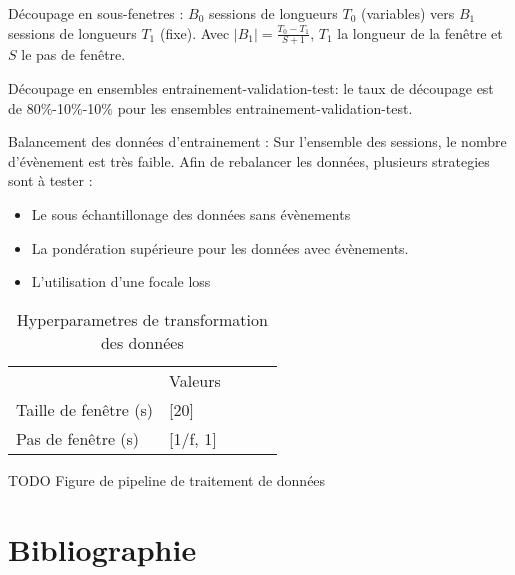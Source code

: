 \documentclass{article}
\begin{document}
    Découpage en sous-fenetres : $B_0$ sessions de longueurs $T_0$ (variables) vers $B_1$ sessions de longueurs $T_1$ (fixe). Avec $|B_1| = \frac{T_0-T_1}{S+1}$, $T_1$ la longueur de la fenêtre et $S$ le pas de fenêtre.

    Découpage en ensembles entrainement-validation-test: le taux de découpage est de 80\%-10\%-10\% pour les ensembles entrainement-validation-test.

    Balancement des données d'entrainement : Sur l'ensemble des sessions, le nombre d'évènement est très faible. Afin de rebalancer les données, plusieurs strategies sont à tester :
    \begin{itemize}
        \item Le sous échantillonage des données sans évènements
        \item La pondération supérieure pour les données avec évènements.
        \item L'utilisation d'une focale loss
    \end{itemize}

    \begin{table}[]
    \begin{tabular}{l|l|lll}
    \cline{2-2}
                                                & Valeurs      &  &  &  \\ \cline{1-2}
    \multicolumn{1}{|l|}{Taille de fenêtre (s)} & {[}20{]}     &  &  &  \\ \cline{1-2}
    \multicolumn{1}{|l|}{Pas de fenêtre (s)}    & {[}1/f, 1{]} &  &  &  \\ \cline{1-2}
    \end{tabular}
    \caption{Hyperparametres de transformation des données}
    \end{table}

    TODO Figure de pipeline de traitement de données

    \section{Bibliographie}
\end{document}

